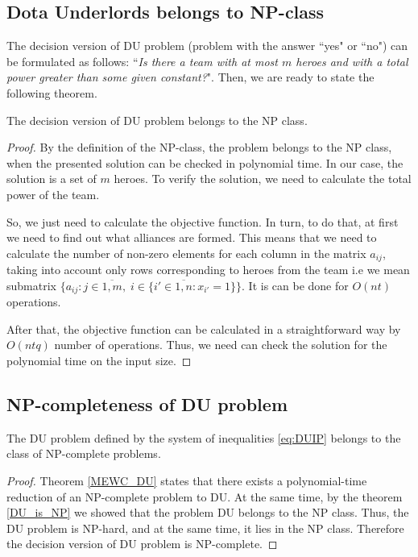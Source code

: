 \documentclass[smallextended]{svjour3}       %
\begin{document}
\subsection{Dota Underlords belongs to NP-class}
The decision version of DU problem (problem with the answer ``yes" or ``no") can be formulated as follows: ``\textit{Is there a team with at most $ m $ heroes and with a total power greater than some given constant?}". Then, we are ready to state the following theorem.
\begin{theorem}
\label{DU_is_NP}
The decision version of DU problem belongs to the  NP class.
\end{theorem}
\begin{proof}

By the definition of the NP-class, the problem belongs to the NP class, when the presented solution can be checked in polynomial time. In our case, the solution is a set of $m$ heroes. To verify the solution, we need to calculate the total power of the team. 

So, we just need to calculate the objective function. In turn, to do that, at first we need to find out what alliances are formed. This means that we need to calculate the number of non-zero elements for each column in the matrix $a_{ij}$, taking into account only rows corresponding to heroes from the team i.e  we mean submatrix $\{a_{ij}:  j \in \overline{1,m},\; i \in \{  i' \in \overline{1,n} :   x_{i'} = 1 \}  \}$. It is can be done for $O(nt)$ operations. 

After that, the objective function can be calculated in a straightforward way by $O(ntq)$ number of operations. Thus, we need can check the solution for the polynomial time on the input size. 
\end{proof}

\subsection{NP-completeness of DU problem}
\begin{theorem}
	The DU problem defined by the system of inequalities \eqref{eq:DUIP}  belongs to the class of NP-complete problems.
\end{theorem}

\begin{proof}
Theorem \ref{MEWC_DU} states that there exists a polynomial-time reduction of an NP-complete problem to DU. At the same time, by the theorem \ref{DU_is_NP} we showed that the problem DU belongs to the NP class. Thus, the DU problem is NP-hard, and at the same time, it lies in the NP class. Therefore the decision version of DU problem is NP-complete.	
\end{proof}
\end{document}
